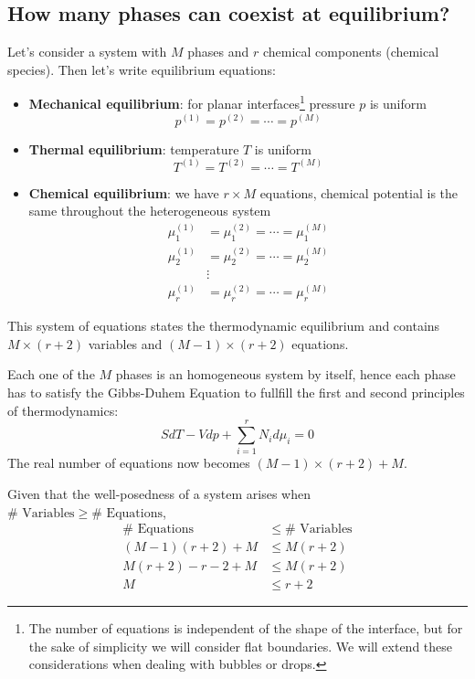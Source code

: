 \subsection{How many phases can coexist at equilibrium?}
Let's consider a system with $M$ phases and $r$ chemical components (chemical
species). Then let's write equilibrium equations:
\begin{itemize}
    \item \textbf{Mechanical equilibrium}: for planar interfaces\footnote{The
    number of equations is independent of the shape of the interface, but for
    the sake of simplicity we will consider flat boundaries. We will extend
    these considerations when dealing with bubbles or drops.} pressure $p$ is
    uniform
    \begin{equation*}
        p^{(1)} = p^{(2)} = \cdots = p^{(M)}
    \end{equation*}
    \item \textbf{Thermal equilibrium}: temperature $T$ is uniform
    \begin{equation*}
        T^{(1)} = T^{(2)} = \cdots = T^{(M)}
    \end{equation*}
    \item \textbf{Chemical equilibrium}: we have $r\times M$ equations, chemical
    potential is the same throughout the heterogeneous system
    \begin{align*}
        \mu_1^{(1)} &= \mu_1^{(2)} = \cdots = \mu_1^{(M)} \\
        \mu_2^{(1)} &= \mu_2^{(2)} = \cdots = \mu_2^{(M)} \\
        &\vdots \\
        \mu_r^{(1)} &= \mu_r^{(2)} = \cdots = \mu_r^{(M)}
    \end{align*}
\end{itemize}

This system of equations states the thermodynamic equilibrium and contains
$M\times(r+2)$ variables and $(M-1)\times(r+2)$ equations.

Each one of the $M$ phases is an homogeneous system by itself, hence each phase
has to satisfy the Gibbs-Duhem Equation to fullfill the first and second
principles of thermodynamics:
\begin{equation*}
    SdT-Vdp+\sum_{i=1}^r N_i d\mu_i = 0
\end{equation*}
The real number of equations now becomes $(M-1)\times(r+2) + M$.

Given that the well-posedness of a system arises when $\#\text{ Variables} \ge
\#\text{ Equations}$,
\begin{align*}
    \#\text{ Equations} &\le \#\text{ Variables} \\
    (M-1)(r+2)+M &\le M(r+2) \\
    M(r+2)-r-2+M &\le M(r+2) \\
    M &\le r+2
\end{align*}

